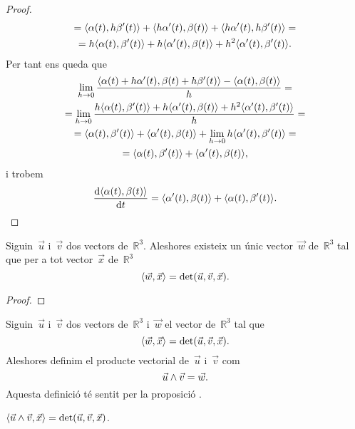 \documentclass[../../Main.tex]{subfiles}
\begin{document}
\begin{proposition}
\begin{proof}
\begin{multline*}
				=\prodesc{\alpha(t)}{h\beta'(t)}+\prodesc{h\alpha'(t)}{\beta(t)}+\prodesc{h\alpha'(t)}{h\beta'(t)}=\\
				=h\prodesc{\alpha(t)}{\beta'(t)}+h\prodesc{\alpha'(t)}{\beta(t)}+h^{2}\prodesc{\alpha'(t)}{\beta'(t)}.
			\end{multline*}
			Per tant ens queda que
			\begin{multline*}
				\lim_{h\to0}\frac{\prodesc{\alpha(t)+h\alpha'(t)}{\beta(t)+h\beta'(t)}-\prodesc{\alpha(t)}{\beta(t)}}{h}=\\
				=\lim_{h\to0}\frac{h\prodesc{\alpha(t)}{\beta'(t)}+h\prodesc{\alpha'(t)}{\beta(t)}+h^{2}\prodesc{\alpha'(t)}{\beta'(t)}}{h}=\\
				=\prodesc{\alpha(t)}{\beta'(t)}+\prodesc{\alpha'(t)}{\beta(t)}+\lim_{h\to0}h\prodesc{\alpha'(t)}{\beta'(t)}=\\
				=\prodesc{\alpha(t)}{\beta'(t)}+\prodesc{\alpha'(t)}{\beta(t)},
			\end{multline*}
			i trobem
			\[
			    \frac{\diff\prodesc{\alpha(t)}{\beta(t)}}{\diff t}=\prodesc{\alpha'(t)}{\beta(t)}+\prodesc{\alpha(t)}{\beta'(t)}.\qedhere
			\]
		\end{proof}
	\end{proposition}
	\begin{proposition}
		\label{prop:unicitat del producte vectorial entre dos vectors}
		Siguin~\(\vec{u}\) i~\(\vec{v}\) dos vectors de~\(\mathbb{R}^{3}\).
		Aleshores existeix un únic vector~\(\vec{w}\) de~\(\mathbb{R}^{3}\) tal que per a tot vector~\(\vec{x}\) de~\(\mathbb{R}^{3}\)
		\[
		    \prodesc{\vec{w}}{\vec{x}}=\det(\vec{u},\vec{v},\vec{x}).
		\]
		\begin{proof}
		\end{proof}
	\end{proposition}
	\begin{definition}
		\label{def:producte vectorial}
		Siguin~\(\vec{u}\) i~\(\vec{v}\) dos vectors de~\(\mathbb{R}^{3}\) i~\(\vec{w}\) el vector de~\(\mathbb{R}^{3}\) tal que
		\[
		    \prodesc{\vec{w}}{\vec{x}}=\det(\vec{u},\vec{v},\vec{x}).
		\]
		Aleshores definim el producte vectorial de~\(\vec{u}\) i~\(\vec{v}\) com
		\[
		    \vec{u}\mathbin{\wedge}\vec{v}=\vec{w}.
		\]
		Aquesta definició té sentit per la proposició .
	\end{definition}
	\begin{observation}
		\label{obs:fórmula del determinant segons el producte vectorial i el producte escalar}
		\(\prodesc{\vec{u}\prodvec\vec{v}}{\vec{x}}=\det(\vec{u},\vec{v},\vec{x})\).
	\end{observation}
\end{document}
